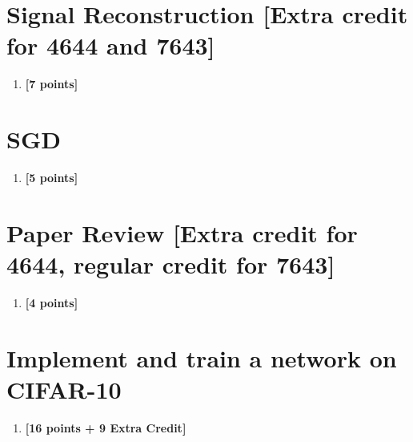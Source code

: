 \documentclass[11pt,english]{article}
\begin{document}
\section{Signal Reconstruction [Extra credit for 4644 and 7643]}
\begin{enumerate}[resume]

\item 
\textbf{[7 points]}


\end{enumerate}

\section{SGD}
\begin{enumerate}[resume]

\item 
\textbf{[5 points]}


\end{enumerate}


\section{Paper Review [Extra credit for 4644, regular credit for 7643]}
\begin{enumerate}[resume]

\item 
\textbf{[4 points]}


\end{enumerate}


\section{Implement and train a network on CIFAR-10}
\begin{enumerate}[resume]

\item
\textbf{[16 points + 9 Extra Credit]}


\end{enumerate}
\end{document}
